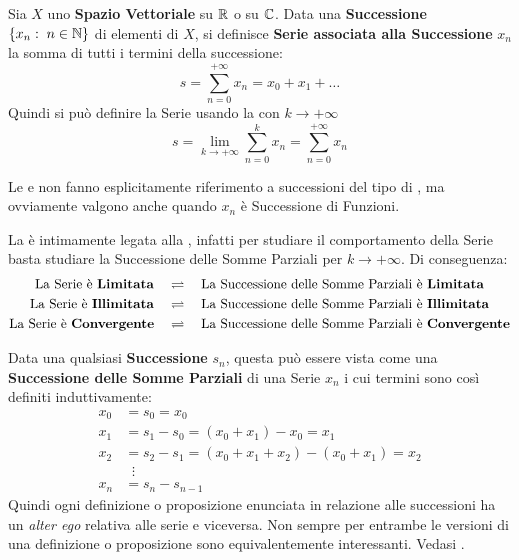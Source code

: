 \begin{definition}[Serie]
	\label{def:serie}
	Sia $X$ uno \textbf{Spazio Vettoriale} su $\mathbb{R}$ o su $\mathbb{C}$. Data una \textbf{Successione} $\left\{x_n:\; n \in \mathbb{N}\right\}$ di elementi di $X$, si definisce \textbf{Serie associata alla Successione} $x_n$ la somma di tutti i termini della successione:
	\[s = \sum\limits_{n = 0}^{+\infty} x_n = x_0 + x_1 + \dots\]
	Quindi si può definire la Serie usando la  con $k \to +\infty$
	\[s = \lim\limits_{k \to +\infty} \sum\limits_{n = 0}^{k} x_n = \sum\limits_{n = 0}^{+\infty} x_n\]
\end{definition}
\begin{observation}
	Le  e  non fanno esplicitamente riferimento a successioni del tipo di , ma ovviamente valgono anche quando $x_n$ è Successione di Funzioni.
\end{observation}
\begin{observation}
	La  è intimamente legata alla , infatti per studiare il comportamento della Serie basta studiare la Successione delle Somme Parziali per $k \to +\infty$. Di conseguenza:
	\begin{align*}
		\text{La Serie è \textbf{Limitata}} \quad &\rightleftharpoons \quad \text{La Successione delle Somme Parziali è \textbf{Limitata}}\\
		\text{La Serie è \textbf{Illimitata}} \quad &\rightleftharpoons \quad \text{La Successione delle Somme Parziali è \textbf{Illimitata}}\\
		\text{La Serie è \textbf{Convergente}} \quad &\rightleftharpoons \quad \text{La Successione delle Somme Parziali è \textbf{Convergente}}
	\end{align*}
\end{observation}
\begin{observation}
	Data una qualsiasi \textbf{Successione} $s_n$, questa può essere vista come una \textbf{Successione delle Somme Parziali} di una Serie $x_n$ i cui termini sono così definiti induttivamente:
	\begin{align*}
		x_0 &= s_0 = x_0\\
		x_1 &= s_1 - s_0 = (x_0 + x_1) - x_0 = x_1\\
		x_2 &= s_2 - s_1 = (x_0 + x_1 + x_2) - (x_0 + x_1) = x_2\\
		&\;\;\vdots\\
		x_n &= s_n - s_{n - 1}
	\end{align*}
	Quindi ogni definizione o proposizione enunciata in relazione alle successioni ha un \textit{alter ego} relativa alle serie e viceversa. Non sempre per entrambe le versioni di una definizione o proposizione sono equivalentemente interessanti. Vedasi .
\end{observation}
